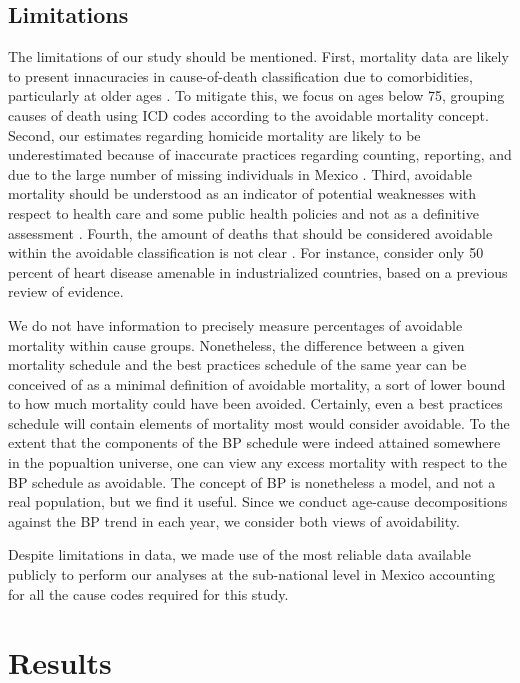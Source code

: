 \documentclass{article}
\begin{document}
\subsection*{Limitations}
The limitations of our study should be mentioned. First, mortality data are
likely to present innacuracies in cause-of-death classification due to
comorbidities, particularly at older ages \citep{tobias2001}. To mitigate this,
we focus on ages below 75, grouping causes of death using ICD codes according to
the avoidable mortality concept.
Second, our estimates regarding homicide mortality are likely to be
underestimated because of inaccurate practices regarding counting, reporting,
and due to the large number of missing individuals in Mexico \citep{HRW2011}.
Third, avoidable mortality should be understood as an indicator of potential
weaknesses with respect to health care and some public health policies and not
as a definitive assessment \citep{nolte&mckee2008}. Fourth, the amount of deaths
that should be considered avoidable within the avoidable classification is not
clear \citep{beltran2011avoidable}. For instance, \citet{nolte2012amenable}
consider only 50 percent of heart disease amenable in industrialized countries,
based on a previous review of evidence.

We do not have information to precisely
measure percentages of avoidable mortality within cause groups. Nonetheless, the
difference between a given mortality schedule and the best practices schedule of
the same year can be conceived of as a minimal definition of avoidable
mortality, a sort of lower bound to how much mortality could have been avoided.
Certainly, even a best practices schedule will contain elements of mortality
most would consider avoidable. To the extent that the components of the BP schedule were indeed
attained somewhere in the popualtion universe, one can view any excess mortality
with respect to the BP schedule as avoidable. The concept of BP is nonetheless a
model, and not a real population, but we find it useful. Since we conduct
age-cause decompositions against the BP trend in each year, we consider both
views of avoidability.

Despite limitations in data, we made use of the most reliable data available
publicly to perform our analyses at the sub-national level in Mexico accounting
for all the cause codes required for this study.

\section*{Results}
\end{document}
